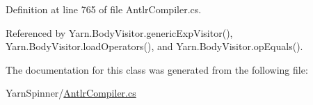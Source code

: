Definition at line 765 of file Antlr\-Compiler.\-cs.



Referenced by Yarn.\-Body\-Visitor.\-generic\-Exp\-Visitor(), Yarn.\-Body\-Visitor.\-load\-Operators(), and Yarn.\-Body\-Visitor.\-op\-Equals().



The documentation for this class was generated from the following file\-:\begin{DoxyCompactItemize}
\item 
Yarn\-Spinner/\hyperlink{a00288}{Antlr\-Compiler.\-cs}\end{DoxyCompactItemize}
